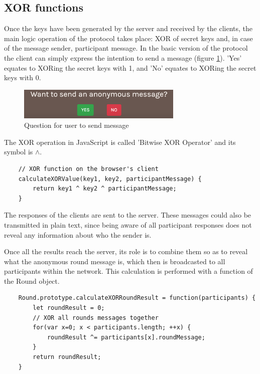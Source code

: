 \subsection{XOR functions}
Once the keys have been generated by the server and received by the clients, the main logic operation of the protocol takes place: XOR of secret keys and, in case of the message sender, participant message. In the basic version of the protocol the client can simply express the intention to send a message (figure \ref{fig:sendMessageQuestion}). 'Yes' equates to XORing the secret keys with 1, and 'No' equates to XORing the secret keys with 0.


\begin{figure}[H]
    \centering
    \includegraphics[width=0.7\textwidth]{Images/Implementation/sendMessageQuestion.png}
    \caption{Question for user to send message}
    \label{fig:sendMessageQuestion}
\end{figure}



\noindent The XOR operation in JavaScript is called 'Bitwise XOR Operator' \cite{XORJS} and its symbol is $\wedge$.
\begin{lstlisting}
    // XOR function on the browser's client
    calculateXORValue(key1, key2, participantMessage) {
        return key1 ^ key2 ^ participantMessage;
    }
\end{lstlisting}

The responses of the clients are sent to the server. These messages could also be transmitted in plain text, since being aware of all participant responses does not reveal any information about who the sender is. \newline

Once all the results reach the server, its role is to combine them so as to reveal what the anonymous round message is, which then is broadcasted to all participants within the network. This calculation is performed with a function of the Round object.
\begin{lstlisting}
    Round.prototype.calculateXORRoundResult = function(participants) {
        let roundResult = 0;
        // XOR all rounds messages together
        for(var x=0; x < participants.length; ++x) {
            roundResult ^= participants[x].roundMessage;
        }
        return roundResult;
    }
\end{lstlisting}


